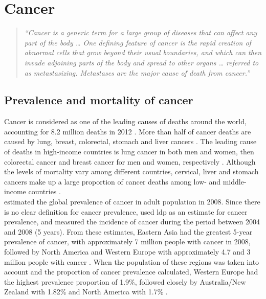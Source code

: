 
\section{Cancer}
\label{sec:cancer}

\begin{quote}
	\textit{
	``Cancer is a generic term for a large group of diseases that can affect any part of the body \ldots{}
	One defining feature of cancer is the rapid creation of abnormal cells that grow beyond their usual boundaries, and which can then invade adjoining parts of the body and spread to other organs \ldots{}
	referred to as metastasizing.
	Metastases are the major cause of death from cancer.''
	\citep{WHO2016}
	}
\end{quote}

\subsection{Prevalence and mortality of cancer}
\label{sub:prevalence_and_mortality_of_cancer}


Cancer is considered as one of the leading causes of deaths around the world, accounting for 8.2 million deaths in 2012 \citep{WHO2014}.
More than half of cancer deaths are caused by lung, breast, colorectal, stomach and liver cancers \citep{WHO2014}.
The leading cause of deaths in high-income countries is lung cancer in both men and women, then colorectal cancer and breast cancer for men and women, respectively \citep{WHO2014}.
Although the levels of mortality vary among different countries, cervical, liver and stomach cancers make up a large proportion of cancer deaths among low- and middle-income countries \citep{WHO2014}.
\\

\noindent
\citet{Bray2013} estimated the global prevalence of cancer in adult population in 2008.
Since there is no clear definition for cancer prevalence, \citet{Bray2013} used \gls{ldp} as an estimate for cancer prevalence, and measured the incidence of cancer during the period between 2004 and 2008 (5 years).
From these estimates, Eastern Asia had the greatest 5-year prevalence of cancer, with approximately 7 million people with cancer in 2008, followed by North America and Western Europe with approximately 4.7 and 3 million people with cancer \citep{Bray2013}.
When the population of these regions was taken into account and the proportion of cancer prevalence calculated, Western Europe had the highest prevalence proportion of 1.9\%, followed closely by Australia/New Zealand with 1.82\% and North America with 1.7\% \citep{Bray2013}.

